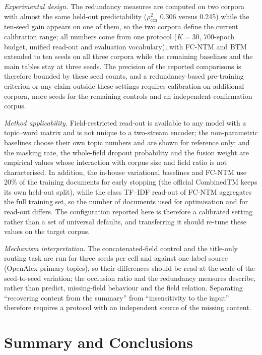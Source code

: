 \documentclass[Journal,letterpaper,NoLists]{ascelike-new}
\begin{document}
\emph{Experimental design.} The redundancy measures are computed on two corpora with almost the
same held-out predictability ($\rho^2_{\mathrm{cca}}$ 0.306 versus 0.245) while the ten-seed gain
appears on one of them, so the two corpora define the current calibration range; all numbers come
from one protocol ($K=30$, 700-epoch budget, unified read-out and evaluation vocabulary), with
FC-NTM and BTM extended to ten seeds on all three corpora while the remaining baselines and the
main tables stay at three seeds. The precision of the reported comparisons is therefore bounded by
these seed counts, and a redundancy-based pre-training criterion or any claim outside these settings
requires calibration on additional corpora, more seeds for the remaining controls and an independent
confirmation corpus.

\emph{Method applicability.} Field-restricted read-out is available to any model with a
topic--word matrix and is not unique to a two-stream encoder; the non-parametric baselines choose
their own topic numbers and are shown for reference only; and the masking rate, the whole-field dropout
probability and the fusion weight are empirical values whose interaction with corpus size and field
ratio is not characterised. In addition, the in-house variational baselines and FC-NTM use 20\% of the
training documents for early stopping (the official CombinedTM keeps its own held-out split), while
the class TF--IDF read-out of FC-NTM aggregates the full training set, so the number of documents
used for optimisation and for read-out differs. The configuration reported here is therefore a
calibrated setting rather than a set of universal defaults, and transferring it should re-tune these
values on the target corpus.

\emph{Mechanism interpretation.} The concatenated-field control and the title-only routing task
are run for three seeds per cell and against one label source (OpenAlex primary topics), so their
differences should be read at the scale of the seed-to-seed variation; the occlusion ratio and the
redundancy measures describe, rather than predict, missing-field behaviour and the field relation.
Separating ``recovering content from the summary'' from ``insensitivity to the input'' therefore
requires a protocol with an independent source of the missing content.

\section{Summary and Conclusions}
\end{document}
